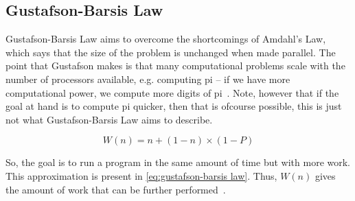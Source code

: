 \subsection{Gustafson-Barsis Law}
\label{sec:gustafson-barsis law}

Gustafson-Barsis Law aims to overcome the shortcomings of Amdahl's Law, which says that the size of the problem is unchanged when made parallel.
The point that Gustafson makes is that many computational problems scale with the number of processors available, e.g. computing pi -- if we have more computational power, we compute more digits of pi~\cite{amdahlorgustafson2011}.
Note, however that if the goal at hand is to compute pi quicker, then that is ofcourse possible, this is just not what Gustafson-Barsis Law aims to describe.

\begin{equation}
  \label{eq:gustafson-barsis law}
  W(n) = n + (1-n) \times (1-P)
\end{equation}

So, the goal is to run a program in the same amount of time but with more work.
This approximation is present in \cref{eq:gustafson-barsis law}.
Thus, $W(n)$ gives the amount of work that can be further performed~\cite{gustafson1988reevaluating}.

